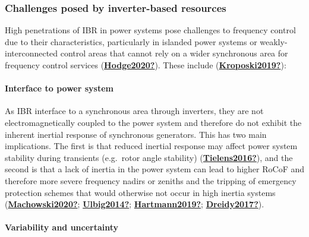 \documentclass[12pt,a4paper,]{report}
\begin{document}
\hypertarget{challenges-posed-by-inverter-based-resources}{%
\subsubsection{Challenges posed by inverter-based
resources}\label{challenges-posed-by-inverter-based-resources}}

High penetrations of IBR in power systems pose challenges to frequency
control due to their characteristics, particularly in islanded power
systems or weakly-interconnected control areas that cannot rely on a
wider synchronous area for frequency control services
(\protect\hyperlink{ref-Hodge2020}{\textbf{Hodge2020?}}). These include
(\protect\hyperlink{ref-Kroposki2019}{\textbf{Kroposki2019?}}):

\hypertarget{interface-to-power-system}{%
\paragraph{Interface to power system}\label{interface-to-power-system}}

As IBR interface to a synchronous area through inverters, they are not
electromagnetically coupled to the power system and therefore do not
exhibit the inherent inertial response of synchronous generators. This
has two main implications. The first is that reduced inertial response
may affect power system stability during transients (e.g.~rotor angle
stability) (\protect\hyperlink{ref-Tielens2016}{\textbf{Tielens2016?}}),
and the second is that a lack of inertia in the power system can lead to
higher RoCoF and therefore more severe frequency nadirs or zeniths and
the tripping of emergency protection schemes that would otherwise not
occur in high inertia systems
(\protect\hyperlink{ref-Machowski2020}{\textbf{Machowski2020?}};
\protect\hyperlink{ref-Ulbig2014}{\textbf{Ulbig2014?}};
\protect\hyperlink{ref-Hartmann2019}{\textbf{Hartmann2019?}};
\protect\hyperlink{ref-Dreidy2017}{\textbf{Dreidy2017?}}).

\hypertarget{variability-and-uncertainty}{%
\paragraph{Variability and
uncertainty}\label{variability-and-uncertainty}}
\end{document}
